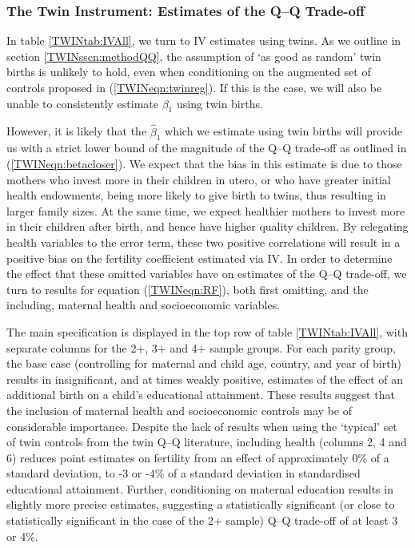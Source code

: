 \documentclass[subeqn]{article}
\begin{document}
\begin{spacing}{1.4}
\subsubsection{The Twin Instrument: Estimates of the Q--Q Trade-off}
In table \ref{TWINtab:IVAll}, we turn to IV estimates using twins.  As we 
outline in section \ref{TWINsscn:methodQQ}, the assumption of `as good as 
random' twin births is unlikely to hold, even when conditioning on the augmented
set of controls proposed in (\ref{TWINeqn:twinreg}). If this is the case, we 
will also be unable to consistently estimate $\beta_1$ using twin births.

However, it is likely that the $\hat\beta_1$ which we estimate using twin births 
will provide us with a strict lower bound of the magnitude of the Q--Q trade-off 
as outlined in (\ref{TWINeqn:betacloser}). We expect that the bias in this 
estimate is due to those mothers who invest more in their children in utero, or 
who have greater initial health endowments, being more likely to give birth to 
twins, thus resulting in larger family sizes. At the same time, we expect 
healthier mothers to invest more in their children after birth, and hence have 
higher quality children. By relegating health variables to the error term, 
these two positive correlations will result in a positive bias on the fertility 
coefficient estimated via IV. In order to determine the effect that these 
omitted variables have on estimates of the Q--Q trade-off, we turn to results 
for equation (\ref{TWINeqn:RF}), both first omitting, and the including, 
maternal health and socioeconomic variables.

The main specification is displayed in the top row of table \ref{TWINtab:IVAll}, 
with separate columns for the 2+, 3+ and 4+ sample groups. For each parity 
group, the base case (controlling for maternal and child age, country, and year 
of birth) results in insignificant, and at times weakly positive, estimates of 
the effect of an additional birth on a child's educational attainment. These 
results suggest that the inclusion of maternal health and socioeconomic controls 
may be of considerable importance. Despite the lack of results when using
the `typical' set of twin controls from the twin Q--Q literature, including 
health (columns 2, 4 and 6) reduces point estimates on fertility from an effect 
of approximately 0\% of a standard deviation, to -3 or -4\% of a standard 
deviation in standardised educational attainment. Further, conditioning on 
maternal education results in slightly more precise estimates, suggesting a 
statistically significant (or close to statistically significant in the case
of the 2+ sample) Q--Q trade-off of at least 3 or 4\%.


\end{spacing}
\end{document}
